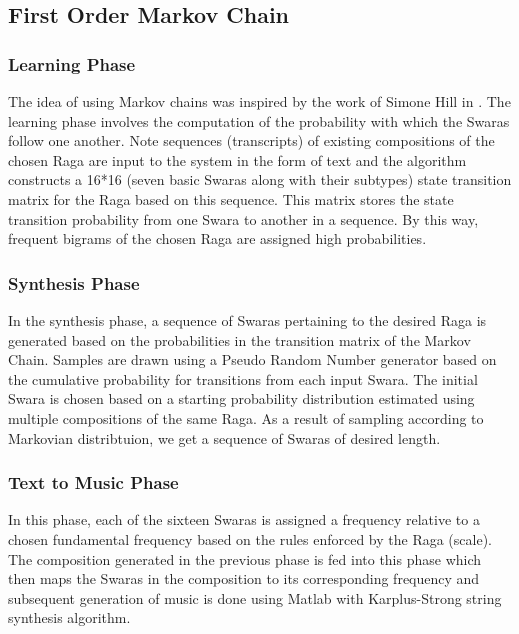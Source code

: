 \documentclass[journal]{IEEEtran}
\begin{document}
\subsection{First Order Markov Chain}
\subsubsection{Learning Phase}
The idea of using Markov chains was inspired by the work of Simone Hill in \cite{hill}. The learning phase involves the computation of the probability with which the Swaras follow one another. Note sequences (transcripts) of existing compositions of the chosen Raga are input to the system in the form of text and the algorithm constructs a 16*16 (seven basic Swaras along with their subtypes) state transition matrix for the Raga based on this sequence. This matrix stores the state transition probability from one Swara to another in a sequence. By this way, frequent bigrams of the chosen Raga are assigned high probabilities.\\

\subsubsection{Synthesis Phase}
In the synthesis phase, a sequence of Swaras pertaining to the desired Raga is generated based on the probabilities in the transition matrix of the Markov Chain. Samples are drawn using a Pseudo Random Number generator based on the cumulative probability for transitions from each input Swara. The initial Swara is chosen based on a starting probability distribution estimated using multiple compositions of the same Raga. As a result of sampling according to Markovian distribtuion, we get a sequence of Swaras of desired length.\\

\subsubsection{Text to Music Phase}
In this phase, each of the sixteen Swaras is assigned a frequency relative to a chosen fundamental frequency based on the rules enforced by the Raga (scale). The composition generated in the previous phase is fed into this phase which then maps the Swaras in the composition to its corresponding frequency and subsequent generation of music is done using Matlab with Karplus-Strong string synthesis algorithm.
\end{document}
